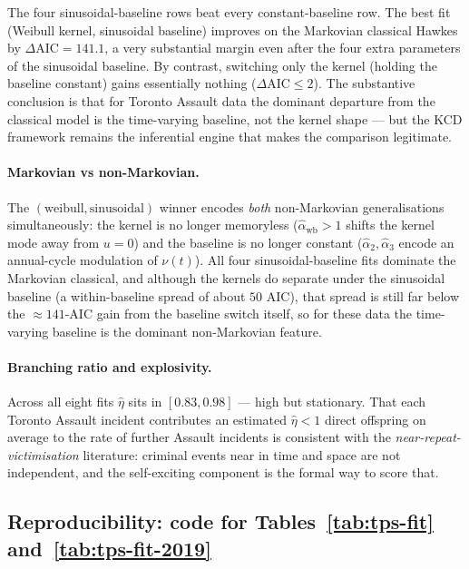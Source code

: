 \documentclass[article,shortnames,nojss]{jss}
\newcommand{\1}{\mathbbm{1}}
\theoremstyle{plain}
\theoremstyle{definition}
\begin{document}
The four sinusoidal-baseline rows beat every constant-baseline row.
The best fit (Weibull kernel, sinusoidal baseline) improves on the
Markovian classical Hawkes by $\Delta\mathrm{AIC} = 141.1$, a very
substantial margin even after the four extra parameters of the
sinusoidal baseline.  By contrast, switching only the kernel
(holding the baseline constant) gains essentially nothing
($\Delta\mathrm{AIC} \le 2$).  The substantive conclusion is
that for Toronto Assault data the dominant departure from the
classical model is the time-varying baseline, not the kernel
shape --- but the KCD framework remains the inferential engine that
makes the comparison legitimate.

\paragraph{Markovian vs non-Markovian.}  The
$(\text{weibull},\text{sinusoidal})$ winner encodes \emph{both}
non-Markovian generalisations simultaneously: the kernel is no
longer memoryless ($\hat\alpha_{\text{wb}}>1$ shifts the kernel
mode away from $u=0$) and the baseline is no longer constant
($\hat\alpha_2,\hat\alpha_3$ encode an annual-cycle modulation of
$\nu(t)$).  All four sinusoidal-baseline fits dominate the
Markovian classical, and although the kernels do separate under
the sinusoidal baseline (a within-baseline spread of about $50$
AIC), that spread is still far below the $\approx 141$-AIC gain
from the baseline switch itself, so for these data the time-varying
baseline is the dominant non-Markovian feature.

\paragraph{Branching ratio and explosivity.}  Across all eight
fits $\hat\eta$ sits in $[0.83, 0.98]$ --- high but stationary.
That each Toronto Assault incident contributes an estimated
$\hat\eta < 1$ direct offspring on average to the rate of further
Assault incidents is consistent with the
\emph{near-repeat-victimisation} literature: criminal events
near in time and space are not independent, and the self-exciting
component is the formal way to score that.

\subsection[Reproducibility code]{Reproducibility: code for Tables~\ref{tab:tps-fit} and~\ref{tab:tps-fit-2019}}
\label{sec:application-reproducibility}
\end{document}
